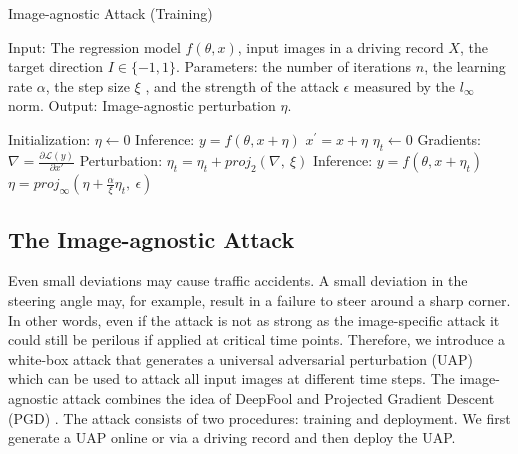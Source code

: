 
\begin{algorithm}[t]
    \caption{Image-agnostic Attack (Training)}\label{alg:image-agnostic-driving}
    \begin{algorithmic}
        \State Input: The regression model $f(\theta, x)$, input images in a driving record $X$, the target direction $I \in \{-1, 1\}$.
        \State Parameters: the number of iterations $n$, the learning rate $\alpha$, the step size $\xi$ , and the strength of the attack $\epsilon$ measured by the $l_{\infty}$ norm.
        \State Output: Image-agnostic perturbation $\eta$.

        \State Initialization: $\eta \leftarrow 0$
                \State Inference: $y = f(\theta, x + \eta)$
                    \State $x^{'} = x + \eta$
                    \State $\eta_{t} \leftarrow 0$
                        \State Gradients: $\nabla = \frac{\partial \mathcal{L}(y)}{\partial x'}$
                        \State Perturbation: $\eta_{t} = \eta_{t} + proj_{2}(\nabla,\ \xi)$
                        \State Inference: $y = f(\theta, x + \eta_t)$
                    \EndWhile
                    \State $\eta = proj_{\infty}(\eta + \frac{\alpha}{\xi} \eta_{t},\ \epsilon)$
                \EndIf
            \EndFor
        \EndFor
    \end{algorithmic}
\end{algorithm}

\subsection{The Image-agnostic Attack}

Even small deviations may cause traffic accidents. A small deviation in the steering angle may, for example, result in a failure to steer around a sharp corner. In other words, even if the attack is not as strong as the image-specific attack it could still be perilous if applied at critical time points. Therefore, we introduce a white-box attack that generates a universal adversarial perturbation (UAP) \citep{moosavi2017universal} which can be used to attack all input images at different time steps. The image-agnostic attack combines the idea of DeepFool \citep{moosavi2016deepfool} and Projected Gradient Descent (PGD) \citep{madry2017towards}. The attack consists of two procedures: training and deployment. We first generate a UAP online or via a driving record and then deploy the UAP.

